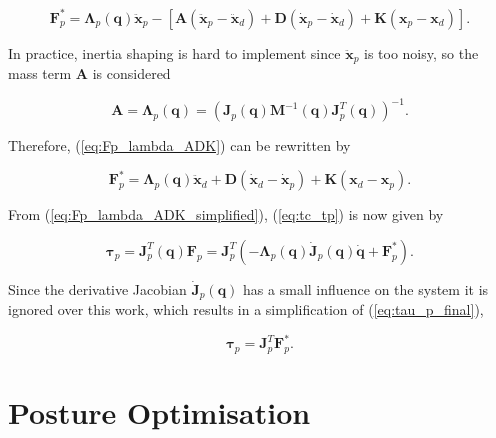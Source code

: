 \begin{equation}
    \label{eq:Fp_lambda_ADK}
    \boldsymbol{F}^*_p = \boldsymbol{\Lambda}_p(\boldsymbol{q}) \boldsymbol{\ddot{x}}_p - [\boldsymbol{A}(\boldsymbol{\ddot{x}}_p - \boldsymbol{\ddot{x}}_d) + \boldsymbol{D}(\boldsymbol{\dot{x}}_p - \boldsymbol{\dot{x}}_d) + \boldsymbol{K}(\boldsymbol{x}_p  -\boldsymbol{x}_d)].
\end{equation}

In practice, inertia shaping is hard to implement since $\boldsymbol{\ddot{x}}_p$ is too noisy, so the mass term $\boldsymbol{A}$ is considered

\begin{equation}
    \boldsymbol{A} = \boldsymbol{\Lambda}_p(\boldsymbol{q}) = (\boldsymbol{J}_p(\boldsymbol{q}) \boldsymbol{M}^{-1}(\boldsymbol{q}) \boldsymbol{J}^T_p (\boldsymbol{q}))^{-1}.
\end{equation}

Therefore, (\ref{eq:Fp_lambda_ADK}) can be rewritten by

\begin{equation}
    \label{eq:Fp_lambda_ADK_simplified}
    \boldsymbol{F}^*_p = \boldsymbol{\Lambda}_p(\boldsymbol{q}) \boldsymbol{\ddot{x}}_d + \boldsymbol{D} (\boldsymbol{\dot{x}}_d - \boldsymbol{\dot{x}}_p) + \boldsymbol{K} (\boldsymbol{x}_d - \boldsymbol{x}_p).
\end{equation}

From (\ref{eq:Fp_lambda_ADK_simplified}), (\ref{eq:tc_tp}) is now given by

\begin{equation}
    \label{eq:tau_p_final}
    \boldsymbol{\tau}_p = \boldsymbol{J}^T_p(\boldsymbol{q}) \boldsymbol{F}_p = \boldsymbol{J}^T_p (-\boldsymbol{\Lambda}_p(\boldsymbol{q}) \boldsymbol{\dot{J}}_p(\boldsymbol{q}) \boldsymbol{\dot{q}} + \boldsymbol{F}^*_p).
\end{equation}

Since the derivative Jacobian $\boldsymbol{\dot{J}}_p(\boldsymbol{q})$ has a small influence on the system it is ignored over this work, which results in a simplification of (\ref{eq:tau_p_final}),

\begin{equation}
    \boldsymbol{\tau}_p = \boldsymbol{J}^T_p \boldsymbol{F}^*_p .
\end{equation}


\section{Posture Optimisation}
\label{sec:control_architectures_posture_optimisation}

